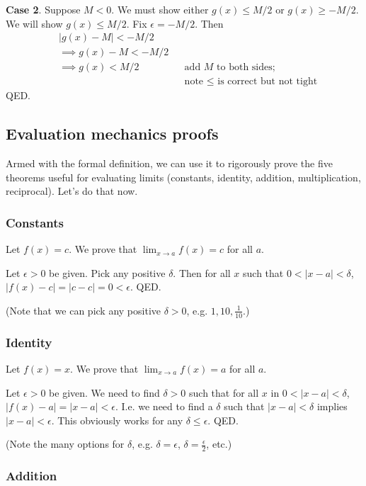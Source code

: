 \textbf{Case 2}. Suppose $M<0$. We must show either $g(x)\leq M/2$ or
$g(x)\geq -M/2$. We will show $g(x)\leq M/2$. Fix $\epsilon=-M/2$. Then
\begin{align*}
    &|g(x)-M|<-M/2\\
    &\implies g(x)-M<-M/2\\
    &\implies g(x)<M/2&&\text{add $M$ to both sides;}\\
    & &&\text{note $\leq$ is correct but not tight}
\end{align*}
QED.

\subsection{Evaluation mechanics proofs}

Armed with the formal definition, we can use it to rigorously prove
the five theorems useful for evaluating limits (constants, identity,
addition, multiplication, reciprocal). Let's do that now.

\subsubsection*{Constants}
Let $f(x)=c$. We prove that $\lim_{x\to a}f(x)=c$ for all $a$.

\vs

Let $\epsilon>0$ be given. Pick any positive $\delta$. Then for all
$x$ such that $0<|x-a|<\delta$, $|f(x)-c|=|c-c|=0<\epsilon$. QED.

\vs

(Note that we can pick any positive $\delta>0$, e.g.
$1, 10, \frac{1}{10}$.)

\subsubsection*{Identity}

Let $f(x)=x$. We prove that $\lim_{x\to a}f(x)=a$ for all $a$.

\vs

Let $\epsilon>0$ be given. We need to find $\delta>0$ such that for all
$x$ in $0<|x-a|<\delta$, $|f(x)-a|=|x-a|<\epsilon$. I.e. we need to find a
$\delta$ such that $|x-a|<\delta$ implies $|x-a|<\epsilon$. This obviously works for
any $\delta\leq\epsilon$. QED.

\vs

(Note the many options for $\delta$, e.g. $\delta=\epsilon$, $\delta=\frac{\epsilon}{2}$, etc.)

\subsubsection*{Addition}

